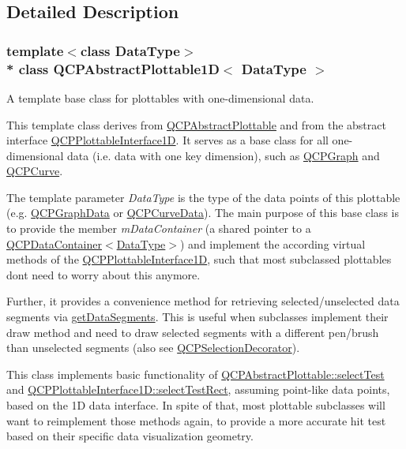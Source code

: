 \subsection{Detailed Description}
\subsubsection*{template$<$class Data\+Type$>$\\*
class Q\+C\+P\+Abstract\+Plottable1\+D$<$ Data\+Type $>$}

A template base class for plottables with one-\/dimensional data. 

This template class derives from \hyperlink{classQCPAbstractPlottable}{Q\+C\+P\+Abstract\+Plottable} and from the abstract interface \hyperlink{classQCPPlottableInterface1D}{Q\+C\+P\+Plottable\+Interface1D}. It serves as a base class for all one-\/dimensional data (i.\+e. data with one key dimension), such as \hyperlink{classQCPGraph}{Q\+C\+P\+Graph} and \hyperlink{classQCPCurve}{Q\+C\+P\+Curve}.

The template parameter {\itshape Data\+Type} is the type of the data points of this plottable (e.\+g. \hyperlink{classQCPGraphData}{Q\+C\+P\+Graph\+Data} or \hyperlink{classQCPCurveData}{Q\+C\+P\+Curve\+Data}). The main purpose of this base class is to provide the member {\itshape m\+Data\+Container} (a shared pointer to a \hyperlink{classQCPDataContainer}{Q\+C\+P\+Data\+Container$<$Data\+Type$>$}) and implement the according virtual methods of the \hyperlink{classQCPPlottableInterface1D}{Q\+C\+P\+Plottable\+Interface1D}, such that most subclassed plottables don\textquotesingle{}t need to worry about this anymore.

Further, it provides a convenience method for retrieving selected/unselected data segments via \hyperlink{classQCPAbstractPlottable1D_a966cb165fb1dfc561d923dc6f8b149ea}{get\+Data\+Segments}. This is useful when subclasses implement their draw method and need to draw selected segments with a different pen/brush than unselected segments (also see \hyperlink{classQCPSelectionDecorator}{Q\+C\+P\+Selection\+Decorator}).

This class implements basic functionality of \hyperlink{classQCPAbstractPlottable_a38efe9641d972992a3d44204bc80ec1d}{Q\+C\+P\+Abstract\+Plottable\+::select\+Test} and \hyperlink{classQCPPlottableInterface1D_a67093e4ccf490ff5f7750640941ff34c}{Q\+C\+P\+Plottable\+Interface1\+D\+::select\+Test\+Rect}, assuming point-\/like data points, based on the 1D data interface. In spite of that, most plottable subclasses will want to reimplement those methods again, to provide a more accurate hit test based on their specific data visualization geometry. 

